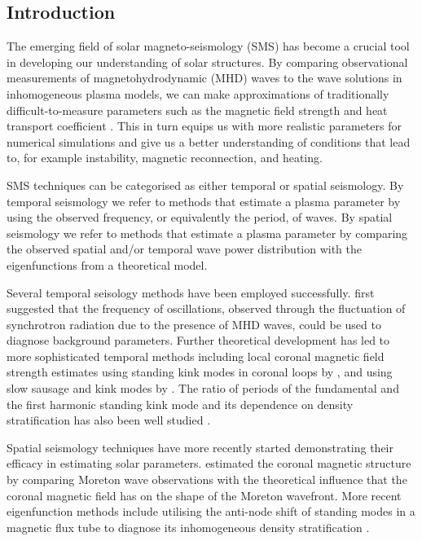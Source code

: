 \documentclass[namedreferences]{solarphysics}
\numberwithin{equation}{section}
\begin{document}
\begin{article}
\section{Introduction}
The emerging field of solar magneto-seismology (SMS) has become a crucial tool in developing our understanding of solar structures. By comparing observational measurements of magnetohydrodynamic (MHD) waves to the wave solutions in inhomogeneous plasma models, we can make approximations of traditionally difficult-to-measure parameters such as the magnetic field strength and heat transport coefficient \citep{nak_etal05,arr12,dem_etal12}. This in turn equips us with more realistic parameters for numerical simulations and give us a better understanding of conditions that lead to, for example instability, magnetic reconnection, and heating.

SMS techniques can be categorised as either temporal or spatial seismology. By temporal seismology we refer to methods that estimate a plasma parameter by using the observed frequency, or equivalently the period, of waves. By spatial seismology we refer to methods that estimate a plasma parameter by comparing the observed spatial and/or temporal wave power distribution with the eigenfunctions from a theoretical model.

Several temporal seisology methods have been employed successfully. \cite{ros70} first suggested that the frequency of oscillations, observed through the fluctuation of synchrotron radiation due to the presence of MHD waves, could be used to diagnose background parameters. Further theoretical development has led to more sophisticated temporal methods including local coronal magnetic field strength estimates using standing kink modes in coronal loops by \cite{nak_etal01}, and using slow sausage and kink modes by \cite{erd_etal08}. The ratio of periods of the fundamental and the first harmonic standing kink mode and its dependence on density stratification has also been well studied \citep{ban_etal07,erd_etal14}.

Spatial seismology techniques have more recently started demonstrating their efficacy in estimating solar parameters. \cite{uch70} estimated the coronal magnetic structure by comparing Moreton wave observations with the theoretical influence that the coronal magnetic field has on the shape of the Moreton wavefront. More recent eigenfunction methods include utilising the anti-node shift of standing modes in a magnetic flux tube to diagnose its inhomogeneous density stratification \citep{ver_etal07,erd_etal14}.


\end{article}
\end{document}
